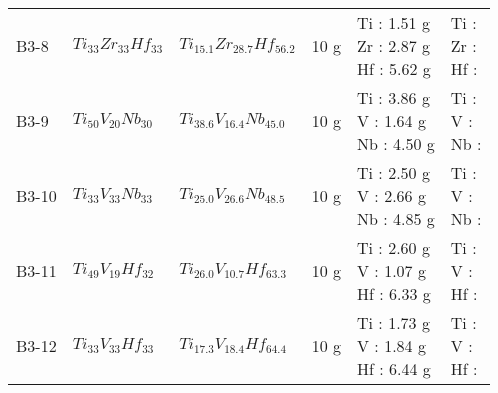 \begin{tabular}{llllll}
             B3-8 &                                $Ti_{33}Zr_{33}Hf_{33}$ &                          $Ti_{15.1}Zr_{28.7}Hf_{56.2}$ &                                  10 g &                                            \makecell[l]{ Ti : 1.51 g \\ Zr : 2.87 g \\ Hf : 5.62 g \\} &                    \makecell[l]{ Ti :\\ Zr :\\ Hf :\\} \\
             B3-9 &                                 $Ti_{50}V_{20}Nb_{30}$ &                           $Ti_{38.6}V_{16.4}Nb_{45.0}$ &                                  10 g &                                             \makecell[l]{ Ti : 3.86 g \\ V : 1.64 g \\ Nb : 4.50 g \\} &                     \makecell[l]{ Ti :\\ V :\\ Nb :\\} \\
            B3-10 &                                 $Ti_{33}V_{33}Nb_{33}$ &                           $Ti_{25.0}V_{26.6}Nb_{48.5}$ &                                  10 g &                                             \makecell[l]{ Ti : 2.50 g \\ V : 2.66 g \\ Nb : 4.85 g \\} &                     \makecell[l]{ Ti :\\ V :\\ Nb :\\} \\
            B3-11 &                                 $Ti_{49}V_{19}Hf_{32}$ &                           $Ti_{26.0}V_{10.7}Hf_{63.3}$ &                                  10 g &                                             \makecell[l]{ Ti : 2.60 g \\ V : 1.07 g \\ Hf : 6.33 g \\} &                     \makecell[l]{ Ti :\\ V :\\ Hf :\\} \\
            B3-12 &                                 $Ti_{33}V_{33}Hf_{33}$ &                           $Ti_{17.3}V_{18.4}Hf_{64.4}$ &                                  10 g &                                             \makecell[l]{ Ti : 1.73 g \\ V : 1.84 g \\ Hf : 6.44 g \\} &                     \makecell[l]{ Ti :\\ V :\\ Hf :\\} \\
\bottomrule
\end{tabular}
